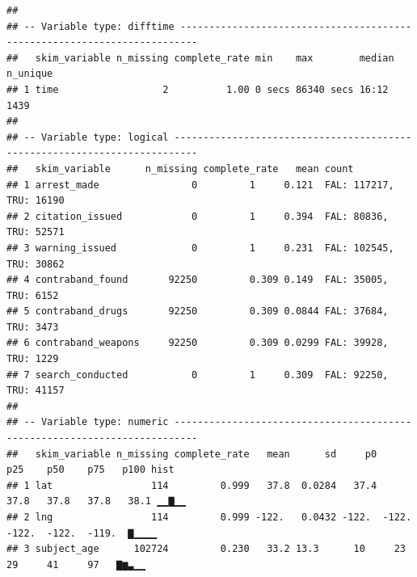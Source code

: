 \documentclass[
]{article}
\begin{document}
\begin{verbatim}
## 
## -- Variable type: difftime -------------------------------------------------------------------------
##   skim_variable n_missing complete_rate min    max        median n_unique
## 1 time                  2          1.00 0 secs 86340 secs 16:12      1439
## 
## -- Variable type: logical --------------------------------------------------------------------------
##   skim_variable      n_missing complete_rate   mean count                  
## 1 arrest_made                0         1     0.121  FAL: 117217, TRU: 16190
## 2 citation_issued            0         1     0.394  FAL: 80836, TRU: 52571 
## 3 warning_issued             0         1     0.231  FAL: 102545, TRU: 30862
## 4 contraband_found       92250         0.309 0.149  FAL: 35005, TRU: 6152  
## 5 contraband_drugs       92250         0.309 0.0844 FAL: 37684, TRU: 3473  
## 6 contraband_weapons     92250         0.309 0.0299 FAL: 39928, TRU: 1229  
## 7 search_conducted           0         1     0.309  FAL: 92250, TRU: 41157 
## 
## -- Variable type: numeric --------------------------------------------------------------------------
##   skim_variable n_missing complete_rate   mean      sd     p0    p25    p50    p75   p100 hist 
## 1 lat                 114         0.999   37.8  0.0284   37.4   37.8   37.8   37.8   38.1 ▁▁▇▁▁
## 2 lng                 114         0.999 -122.   0.0432 -122.  -122.  -122.  -122.  -119.  ▇▁▁▁▁
## 3 subject_age      102724         0.230   33.2 13.3      10     23     29     41     97   ▇▆▃▁▁
\end{verbatim}
\end{document}
